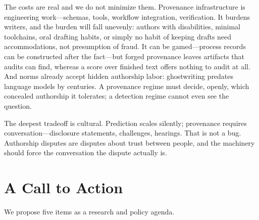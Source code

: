 \documentclass[sigconf,nonacm]{acmart}
\begin{document}
The costs are real and we do not minimize them. Provenance infrastructure is engineering work---schemas, tools, workflow integration, verification. It burdens writers, and the burden will fall unevenly: authors with disabilities, minimal toolchains, oral drafting habits, or simply no habit of keeping drafts need accommodations, not presumption of fraud. It can be gamed---process records can be constructed after the fact---but forged provenance leaves artifacts that audits can find, whereas a score over finished text offers nothing to audit at all. And norms already accept hidden authorship labor: ghostwriting predates language models by centuries. A provenance regime must decide, openly, which concealed authorship it tolerates; a detection regime cannot even see the question.

The deepest tradeoff is cultural. Prediction scales silently; provenance requires conversation---disclosure statements, challenges, hearings. That is not a bug. Authorship disputes are disputes about trust between people, and the machinery should force the conversation the dispute actually is.

\section{A Call to Action}

We propose five items as a research and policy agenda.
\end{document}
